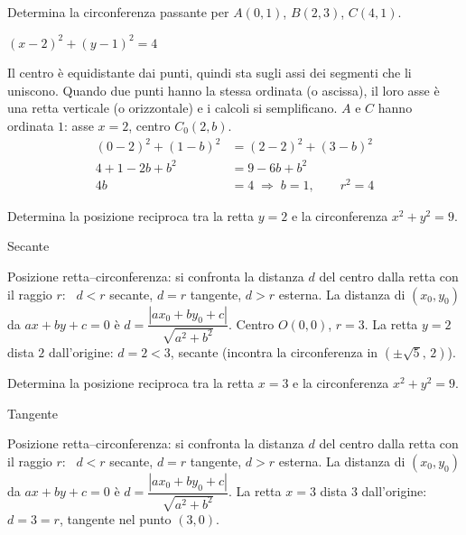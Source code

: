 \begin{question}[ID=2.16, subtitle={Circonferenza per $A(0,1)$, $B(2,3)$, $C(4,1)$}, difficulty=difficile, tags={circonferenza}]
Determina la circonferenza passante per $A(0,1)$, $B(2,3)$, $C(4,1)$.
\begin{solution}
$(x-2)^2+(y-1)^2=4$
\end{solution}
\begin{explanation}
Il centro è equidistante dai punti, quindi sta sugli assi dei segmenti che li uniscono. Quando due punti hanno la stessa ordinata (o ascissa), il loro asse è una retta verticale (o orizzontale) e i calcoli si semplificano.
$A$ e $C$ hanno ordinata $1$: asse $x=2$, centro $C_0(2,b)$.
\[\begin{aligned}
(0-2)^2+(1-b)^2 &= (2-2)^2+(3-b)^2\\
4+1-2b+b^2 &= 9-6b+b^2\\
4b &= 4 \;\Rightarrow\; b=1, \qquad r^2=4
\end{aligned}\]
\end{explanation}
\end{question}

\begin{question}[ID=3.1, subtitle={Posizione di $y=2$ rispetto a $x^2+y^2=9$}, difficulty=facile, tags={retta, circonferenza, posizione reciproca}]
Determina la posizione reciproca tra la retta $y=2$ e la circonferenza $x^2+y^2=9$.
\begin{solution}
Secante
\end{solution}
\begin{explanation}
Posizione retta–circonferenza: si confronta la distanza $d$ del centro dalla retta con il raggio $r$: \ $d<r$ secante, $d=r$ tangente, $d>r$ esterna. La distanza di $(x_0,y_0)$ da $ax+by+c=0$ è $d=\dfrac{|ax_0+by_0+c|}{\sqrt{a^2+b^2}}$.
Centro $O(0,0)$, $r=3$. La retta $y=2$ dista $2$ dall'origine: $d=2<3$, secante (incontra la circonferenza in $(\pm\sqrt5,\,2)$).
\end{explanation}
\end{question}


\begin{question}[ID=3.2, subtitle={Posizione di $x=3$ rispetto a $x^2+y^2=9$}, difficulty=facile, tags={retta, circonferenza, posizione reciproca}]
Determina la posizione reciproca tra la retta $x=3$ e la circonferenza $x^2+y^2=9$.
\begin{solution}
Tangente
\end{solution}
\begin{explanation}
Posizione retta–circonferenza: si confronta la distanza $d$ del centro dalla retta con il raggio $r$: \ $d<r$ secante, $d=r$ tangente, $d>r$ esterna. La distanza di $(x_0,y_0)$ da $ax+by+c=0$ è $d=\dfrac{|ax_0+by_0+c|}{\sqrt{a^2+b^2}}$.
La retta $x=3$ dista $3$ dall'origine: $d=3=r$, tangente nel punto $(3,0)$.
\end{explanation}
\end{question}

